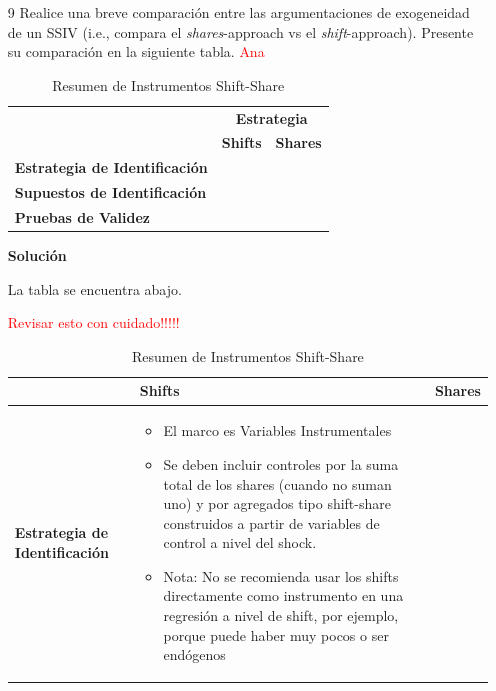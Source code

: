 \documentclass[a4paper, answers, addpoints, 11pt]{exam}
\newenvironment{solucion}{%
  \begin{mdframed}[
    backgroundcolor=blue!5,    %
    linecolor=blue!50,          %
    linewidth=2pt,              %
    leftmargin=10pt,            %
    rightmargin=8pt,           %
    topline=true,              %
    bottomline=true,            %
    roundcorner=10pt,           %
    innerleftmargin=10pt,       %
    innerrightmargin=10pt,      %
    innerbottommargin=10pt,     %
    innertopmargin=10pt         %
  ]%
  \begin{tcolorbox}[colframe=blue!50!black, colback=blue!50, coltitle=white, sharp corners=all, boxrule=1mm, width=\textwidth, halign=left, valign=center, top=0mm, bottom=0mm, left=0mm, right=0mm] \textbf{Solución} \end{tcolorbox} }{\end{mdframed}}
\begin{document}
\begin{enumerate}
    \item[9] Realice una breve comparación entre las argumentaciones de exogeneidad de un SSIV (i.e., compara el \textit{shares}-approach vs el \textit{shift}-approach). Presente su comparación en la siguiente tabla.
\textcolor{red}{Ana}
\begin{table}[H]
\centering
\caption{Resumen de Instrumentos Shift-Share}
\label{tab:takeaways}
\begin{tabular}{p{6cm} p{6cm} p{6cm}}
\hline
 & \multicolumn{2}{c}{\textbf{Estrategia}} \\
\cline{2-3}
 & \multicolumn{1}{c}{\textbf{Shifts}} & \multicolumn{1}{c}{\textbf{Shares}} \\
\hline
\textbf{Estrategia de Identificación} 
& 
&  \\
\textbf{Supuestos de Identificación} 
& 
&  \\
\textbf{Pruebas de Validez} 
&  
&  \\
\hline
\end{tabular}
\end{table}
\begin{solucion}
La tabla se encuentra abajo.
\end{solucion}
\textcolor{red}{Revisar esto con cuidado!!!!!}
\begin{table}[H]
\centering
\caption{Resumen de Instrumentos Shift-Share}
\label{tab:takeaways}
\begin{tabular}{p{5cm} p{6cm} p{6cm}}
\hline
 & \textbf{Shifts} & \textbf{Shares} \\
\hline
\textbf{Estrategia de Identificación} 
& 
\begin{itemize}
    \item El marco es Variables Instrumentales
    \item Se deben incluir controles por la suma total de los shares (cuando no suman uno) y por agregados tipo shift-share construidos a partir de variables de control a nivel del shock.
    \item Nota: No se recomienda usar los shifts directamente como instrumento en una regresión a nivel de shift, por ejemplo, porque puede haber muy pocos o ser endógenos
\end{itemize}


\end{tabular}
\end{table}
\end{enumerate}
\end{document}
